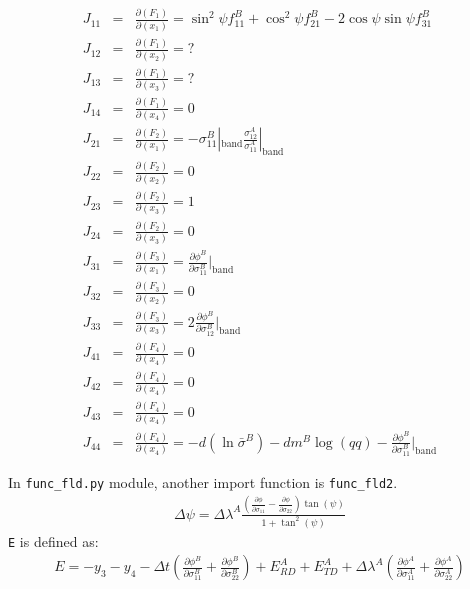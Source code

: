 \documentclass[12pt]{amsart}
\begin{document}
\begin{eqnarray}
  \label{eq:jacob_func_fld1}
  J_{11}&=&\frac{\partial(F_1)}{\partial(x_1)}= \sin^2\psi f^B_{11}+\cos^2\psi f^B_{21}-2\cos\psi\sin\psi f^B_{31}\\
  J_{12}&=&\frac{\partial(F_1)}{\partial(x_2)}= ?\nonumber \\
  J_{13}&=&\frac{\partial(F_1)}{\partial(x_3)}= ?\nonumber\\
  J_{14}&=&\frac{\partial(F_1)}{\partial(x_4)}=0  \nonumber\\
  J_{21}&=&\frac{\partial(F_2)}{\partial(x_1)}=-\sigma_{11}^B|_\text{band} \frac{\sigma_{12}^A}{\sigma_{11}^A}|_\text{band}  \nonumber\\
  J_{22}&=&\frac{\partial(F_2)}{\partial(x_2)}=0  \nonumber\\
  J_{23}&=&\frac{\partial(F_2)}{\partial(x_3)}=1  \nonumber\\
  J_{24}&=&\frac{\partial(F_2)}{\partial(x_3)}=0  \nonumber\\
  J_{31}&=&\frac{\partial(F_3)}{\partial(x_1)}=\frac{\partial \phi^B}{\partial \sigma^B_{11}}|_\text{band}    \nonumber\\
  J_{32}&=&\frac{\partial(F_3)}{\partial(x_2)}=0  \nonumber\\
  J_{33}&=&\frac{\partial(F_3)}{\partial(x_3)}=2 \frac{\partial \phi^B}{\partial \sigma^B_{12}}|_\text{band}  \nonumber\\
  J_{41}&=&\frac{\partial(F_4)}{\partial(x_4)}=0 \nonumber\\
  J_{42}&=&\frac{\partial(F_4)}{\partial(x_4)}=0\nonumber\\
  J_{43}&=&\frac{\partial(F_4)}{\partial(x_4)}=0\nonumber\\
  J_{44}&=&\frac{\partial(F_4)}{\partial(x_4)}=-d(\ln{\bar{\sigma}^B}) - dm^B \log(qq)-\frac{\partial \phi^B}{\partial \sigma^B_{11}}|_\text{band}\nonumber
\end{eqnarray}



In \verb|func_fld.py| module, another import function is \verb|func_fld2|.
\begin{eqnarray}
  \label{eq:dpsi}
  \Delta\psi=\Delta{\lambda}^A \frac{ (\frac{\partial \phi}{\partial\sigma_{11}}-\frac{\partial \phi}{\partial\sigma_{22}}) \tan(\psi)}    {1+\tan^2(\psi)}
\end{eqnarray}
\verb|E| is defined as:
\begin{eqnarray}
  \label{eq:yancien}
  E = -y_3 - y_4 - \Delta{t} (\frac{\partial \phi^B}{\partial\sigma^B_{11}}+\frac{\partial \phi^B}{\partial\sigma^B_{22}})+E_{RD}^A+E_{TD}^A+\Delta\lambda^A(\frac{\partial \phi^A}{\partial\sigma^A_{11}}+\frac{\partial \phi^A}{\partial\sigma^A_{22}})
\end{eqnarray}
\end{document}
